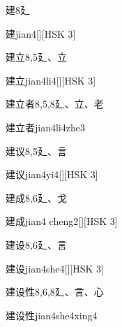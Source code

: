 \begin{entry}{建}{8}{⼵}
  \begin{phonetics}{建}{jian4}[][HSK 3]
  \end{phonetics}
\end{entry}

\begin{entry}{建立}{8,5}{⼵、⽴}
  \begin{phonetics}{建立}{jian4li4}[][HSK 3]
  \end{phonetics}
\end{entry}

\begin{entry}{建立者}{8,5,8}{⼵、⽴、⽼}
  \begin{phonetics}{建立者}{jian4li4zhe3}
  \end{phonetics}
\end{entry}

\begin{entry}{建议}{8,5}{⼵、⾔}
  \begin{phonetics}{建议}{jian4yi4}[][HSK 3]
  \end{phonetics}
\end{entry}

\begin{entry}{建成}{8,6}{⼵、⼽}
  \begin{phonetics}{建成}{jian4 cheng2}[][HSK 3]
  \end{phonetics}
\end{entry}

\begin{entry}{建设}{8,6}{⼵、⾔}
  \begin{phonetics}{建设}{jian4she4}[][HSK 3]
  \end{phonetics}
\end{entry}

\begin{entry}{建设性}{8,6,8}{⼵、⾔、⼼}
  \begin{phonetics}{建设性}{jian4she4xing4}
  \end{phonetics}
\end{entry}

